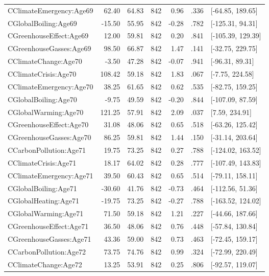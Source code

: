 \begin{table}[ht]
\begin{tabular}{lrrrrrl}
  CClimateEmergency:Age69 & 62.40 & 64.83 & 842 & 0.96 & .336 & [-64.85, 189.65] \\ 
  CGlobalBoiling:Age69 & -15.50 & 55.95 & 842 & -0.28 & .782 & [-125.31, 94.31] \\ 
  CGreenhouseEffect:Age69 & 12.00 & 59.81 & 842 & 0.20 & .841 & [-105.39, 129.39] \\ 
  CGreenhouseGasses:Age69 & 98.50 & 66.87 & 842 & 1.47 & .141 & [-32.75, 229.75] \\ 
  CClimateChange:Age70 & -3.50 & 47.28 & 842 & -0.07 & .941 & [-96.31, 89.31] \\ 
  CClimateCrisis:Age70 & 108.42 & 59.18 & 842 & 1.83 & .067 & [-7.75, 224.58] \\ 
  CClimateEmergency:Age70 & 38.25 & 61.65 & 842 & 0.62 & .535 & [-82.75, 159.25] \\ 
  CGlobalBoiling:Age70 & -9.75 & 49.59 & 842 & -0.20 & .844 & [-107.09, 87.59] \\ 
  CGlobalWarming:Age70 & 121.25 & 57.91 & 842 & 2.09 & .037 & [7.59, 234.91] \\ 
  CGreenhouseEffect:Age70 & 31.08 & 48.06 & 842 & 0.65 & .518 & [-63.26, 125.42] \\ 
  CGreenhouseGasses:Age70 & 86.25 & 59.81 & 842 & 1.44 & .150 & [-31.14, 203.64] \\ 
  CCarbonPollution:Age71 & 19.75 & 73.25 & 842 & 0.27 & .788 & [-124.02, 163.52] \\ 
  CClimateCrisis:Age71 & 18.17 & 64.02 & 842 & 0.28 & .777 & [-107.49, 143.83] \\ 
  CClimateEmergency:Age71 & 39.50 & 60.43 & 842 & 0.65 & .514 & [-79.11, 158.11] \\ 
  CGlobalBoiling:Age71 & -30.60 & 41.76 & 842 & -0.73 & .464 & [-112.56, 51.36] \\ 
  CGlobalHeating:Age71 & -19.75 & 73.25 & 842 & -0.27 & .788 & [-163.52, 124.02] \\ 
  CGlobalWarming:Age71 & 71.50 & 59.18 & 842 & 1.21 & .227 & [-44.66, 187.66] \\ 
  CGreenhouseEffect:Age71 & 36.50 & 48.06 & 842 & 0.76 & .448 & [-57.84, 130.84] \\ 
  CGreenhouseGasses:Age71 & 43.36 & 59.00 & 842 & 0.73 & .463 & [-72.45, 159.17] \\ 
  CCarbonPollution:Age72 & 73.75 & 74.76 & 842 & 0.99 & .324 & [-72.99, 220.49] \\ 
  CClimateChange:Age72 & 13.25 & 53.91 & 842 & 0.25 & .806 & [-92.57, 119.07] \\ 

\end{tabular}
\end{table}
